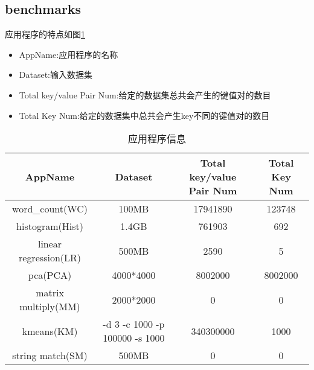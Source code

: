 \subsection{benchmarks}
应用程序的特点如图\ref{appArgs}
\begin{itemize}
\item{AppName:应用程序的名称}
\item{Dataset:输入数据集}
\item{Total key/value Pair Num:给定的数据集总共会产生的键值对的数目}
\item{Total Key Num:给定的数据集中总共会产生key不同的键值对的数目}
\end{itemize}
\begin{table}[!h]
\begin{footnotesize}
\caption{应用程序信息}
\begin{tabularx}{1.22\textwidth}{|c|c|c|c|}
\hline
\textbf{AppName} & \textbf{Dataset} &\textbf{Total key/value Pair Num} &\textbf{Total Key Num}\\
\hline
word\_count(WC) & 100MB & 17941890 & 123748\\  
\hline
histogram(Hist) & 1.4GB &  761903& 692\\ 
\hline
linear regression(LR) & 500MB & 2590& 5\\ 
\hline
pca(PCA) & 4000*4000 & 8002000& 8002000\\ 
\hline
matrix multiply(MM) & 2000*2000 & 0& 0\\ 
\hline
kmeans(KM) & -d 3 -c 1000 -p 100000 -s 1000& 340300000 & 1000\\ 
\hline
string match(SM) & 500MB & 0& 0\\ 
\hline
\end{tabularx}
\label{appArgs}
\end{footnotesize}
\end{table}
